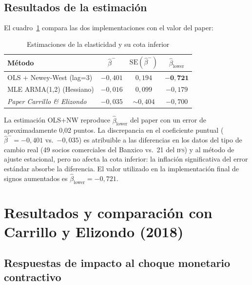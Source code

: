 \documentclass[11pt,letterpaper]{article}
\begin{document}
\subsection{Resultados de la estimación}

El cuadro~\ref{tab:beta_lower_comparacion} compara las dos implementaciones con el valor del paper:

\begin{table}[H]
\centering
\caption{Estimaciones de la elasticidad y su cota inferior}
\label{tab:beta_lower_comparacion}
\small
\begin{tabular}{@{}lccc@{}}
\toprule
\textbf{Método} & $\hat\beta^-$ & $\mathrm{SE}(\hat\beta^-)$ & $\hat\beta_{\text{lower}}$ \\
\midrule
OLS + Newey-West (lag=3)        & $-0{,}401$ & $0{,}194$ & $\bm{-0{,}721}$ \\
MLE ARMA(1,2) (Hessiano)        & $-0{,}016$ & $0{,}099$ & $-0{,}179$ \\
\midrule
\textit{Paper Carrillo \& Elizondo} & \textit{$-0{,}035$} & \textit{$\sim 0{,}404$} & \textit{$-0{,}700$} \\
\bottomrule
\end{tabular}
\end{table}

La estimación OLS+NW reproduce $\hat\beta_{\text{lower}}$ del paper con un error de aproximadamente 0,02 puntos. La discrepancia en el coeficiente puntual ($\hat\beta^- = -0{,}401$ vs.\ $-0{,}035$) es atribuible a las diferencias en los datos del tipo de cambio real (49 socios comerciales del Banxico vs.\ 21 del \textsc{ifs}) y al método de ajuste estacional, pero no afecta la cota inferior: la inflación significativa del error estándar absorbe la diferencia. El valor utilizado en la implementación final de signos aumentados es $\hat\beta_{\text{lower}} = -0{,}721$.

\section{Resultados y comparación con Carrillo y Elizondo (2018)}\label{sec:resultados}

\subsection{Respuestas de impacto al choque monetario contractivo}
\end{document}
